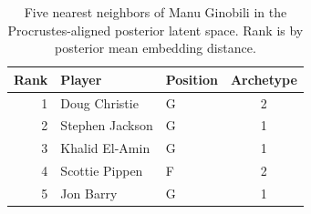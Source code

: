 \begin{table}[htbp]
  \centering\small
  \begin{tabular}{rllc}
    \toprule
    Rank & Player & Position & Archetype \\
    \midrule
    1 & Doug Christie & G & 2 \\
    2 & Stephen Jackson & G & 1 \\
    3 & Khalid El-Amin & G & 1 \\
    4 & Scottie Pippen & F & 2 \\
    5 & Jon Barry & G & 1 \\
    \bottomrule
  \end{tabular}
  \caption{Five nearest neighbors of Manu Ginobili in the Procrustes-aligned posterior latent space. Rank is by posterior mean embedding distance.}
  \label{tab:Manu_Ginobili_neighbors}
\end{table}

